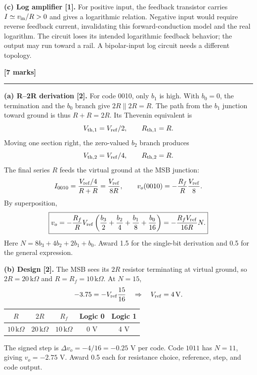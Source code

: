 \documentclass[11pt,a4paper]{article}
\newcommand{\q}[2]{\par\vspace{3pt}{\large\bfseries\color{ink}#1}\hfill\textbf{[#2 marks]}\par\hrule\vspace{7pt}}
\newcommand{\kohm}{\,\mathrm{k}\Omega}
\begin{document}
\textbf{(c) Log amplifier [1].} For positive input, the feedback transistor carries $I\simeq v_{\rm in}/R>0$ and gives a logarithmic relation. Negative input would require reverse feedback current, invalidating this forward-conduction model and the real logarithm. The circuit loses its intended logarithmic feedback behavior; the output may run toward a rail. A bipolar-input log circuit needs a different topology.
\newpage
\q{Question 2}{7}
\textbf{(a) R--2R derivation [2].} For code 0010, only $b_1$ is high. With $b_0=0$, the termination and the $b_0$ branch give $2R\parallel2R=R$. The path from the $b_1$ junction toward ground is thus $R+R=2R$. Its Thevenin equivalent is
\[
V_{\rm th,1}=V_{\rm ref}/2,\qquad R_{\rm th,1}=R.
\]
Moving one section right, the zero-valued $b_2$ branch produces
\[
V_{\rm th,2}=V_{\rm ref}/4,\qquad R_{\rm th,2}=R.
\]
The final series $R$ feeds the virtual ground at the MSB junction:
\[
I_{0010}=\frac{V_{\rm ref}/4}{R+R}=\frac{V_{\rm ref}}{8R},
\qquad v_o(0010)=-\frac{R_f}{R}\frac{V_{\rm ref}}8.
\]
By superposition,
\[
\boxed{v_o=-\frac{R_f}{R}V_{\rm ref}
\left(\frac{b_3}{2}+\frac{b_2}{4}+\frac{b_1}{8}+\frac{b_0}{16}\right)
=-\frac{R_fV_{\rm ref}}{16R}N.}
\]
Here $N=8b_3+4b_2+2b_1+b_0$. Award 1.5 for the single-bit derivation and 0.5 for the general expression.

\textbf{(b) Design [2].} The MSB sees its $2R$ resistor terminating at virtual ground, so $2R=20\kohm$ and $R=R_f=10\kohm$. At $N=15$,
\[
-3.75=-V_{\rm ref}\frac{15}{16}\quad\Rightarrow\quad V_{\rm ref}=4\,\mathrm V.
\]
\begin{center}\begin{tabular}{ccccc}\toprule
$R$ & $2R$ & $R_f$ & Logic 0 & Logic 1\\\midrule
$10\kohm$ & $20\kohm$ & $10\kohm$ & 0 V & 4 V\\\bottomrule\end{tabular}\end{center}
The signed step is $\Delta v_o=-4/16=-0.25$ V per code. Code $1011$ has $N=11$, giving $v_o=-2.75$ V. Award 0.5 each for resistance choice, reference, step, and code output.
\end{document}
